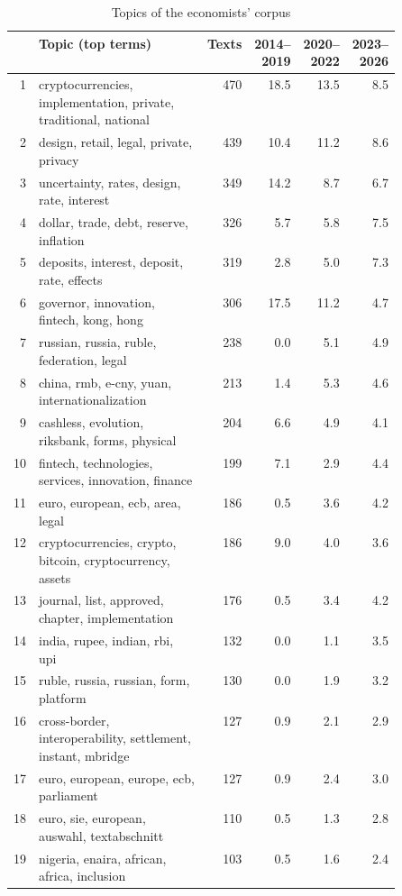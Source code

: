 \begin{table}[htbp]
\centering\small
\caption{Topics of the economists' corpus}\label{tab:topics}
\begin{tabular}{@{}rp{0.5\linewidth}rrrr@{}}
\toprule
& \textbf{Topic (top terms)} & \textbf{Texts} & \textbf{2014--2019} & \textbf{2020--2022} & \textbf{2023--2026} \\
\midrule
1 & cryptocurrencies, implementation, private, traditional, national & 470 & 18.5 & 13.5 & 8.5 \\
2 & design, retail, legal, private, privacy & 439 & 10.4 & 11.2 & 8.6 \\
3 & uncertainty, rates, design, rate, interest & 349 & 14.2 & 8.7 & 6.7 \\
4 & dollar, trade, debt, reserve, inflation & 326 & 5.7 & 5.8 & 7.5 \\
5 & deposits, interest, deposit, rate, effects & 319 & 2.8 & 5.0 & 7.3 \\
6 & governor, innovation, fintech, kong, hong & 306 & 17.5 & 11.2 & 4.7 \\
7 & russian, russia, ruble, federation, legal & 238 & 0.0 & 5.1 & 4.9 \\
8 & china, rmb, e-cny, yuan, internationalization & 213 & 1.4 & 5.3 & 4.6 \\
9 & cashless, evolution, riksbank, forms, physical & 204 & 6.6 & 4.9 & 4.1 \\
10 & fintech, technologies, services, innovation, finance & 199 & 7.1 & 2.9 & 4.4 \\
11 & euro, european, ecb, area, legal & 186 & 0.5 & 3.6 & 4.2 \\
12 & cryptocurrencies, crypto, bitcoin, cryptocurrency, assets & 186 & 9.0 & 4.0 & 3.6 \\
13 & journal, list, approved, chapter, implementation & 176 & 0.5 & 3.4 & 4.2 \\
14 & india, rupee, indian, rbi, upi & 132 & 0.0 & 1.1 & 3.5 \\
15 & ruble, russia, russian, form, platform & 130 & 0.0 & 1.9 & 3.2 \\
16 & cross-border, interoperability, settlement, instant, mbridge & 127 & 0.9 & 2.1 & 2.9 \\
17 & euro, european, europe, ecb, parliament & 127 & 0.9 & 2.4 & 3.0 \\
18 & euro, sie, european, auswahl, textabschnitt & 110 & 0.5 & 1.3 & 2.8 \\
19 & nigeria, enaira, african, africa, inclusion & 103 & 0.5 & 1.6 & 2.4 \\

\end{tabular}
\end{table}
